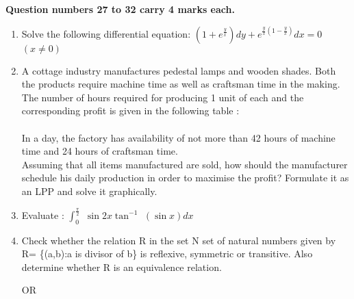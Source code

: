 \documentclass[journal,12pt,twocolumn]{IEEEtran}
\renewcommand\thesection{\arabic{section}}
\begin{document}
\textbf{Question numbers 27 to 32 carry 4 marks each.}\\

\renewcommand{\theequation}{\theenumi}
\begin{enumerate}[label=\thesection.\arabic*.,ref=\thesection.\theenumi]
\item Solve the following differential equation: $(1+e^{\frac{y}{x}}) dy+e^{\frac{y}{x}(1-\frac{y}{x})} dx = 0 $  $(x\not= 0)$

\item A cottage industry manufactures pedestal lamps and wooden shades. Both the products require machine time as well as craftsman time in the making. The number of hours required for producing 1 unit of each and the corresponding profit is given in the following table :\\

\\
In a day, the factory has availability of not more than 42 hours of machine time and 24 hours of craftsman time.\\
Assuming that all items manufactured are sold, how should the manufacturer schedule his daily production in order to maximise the profit? Formulate it as an LPP and solve it graphically.\\

 \item Evaluate : $\int_{0}^{\frac{\pi}{2}}$ $\sin2x \tan^{-1}$  $\left(\sin x\right)dx$\\

\item Check whether the relation R in the set N set of natural numbers given by R= \{(a,b):a is divisor of b\} is reflexive, symmetric or transitive. Also determine whether R is an equivalence relation. 

\begin{center}
        OR
    \end{center}
    

\end{enumerate}
\end{document}
